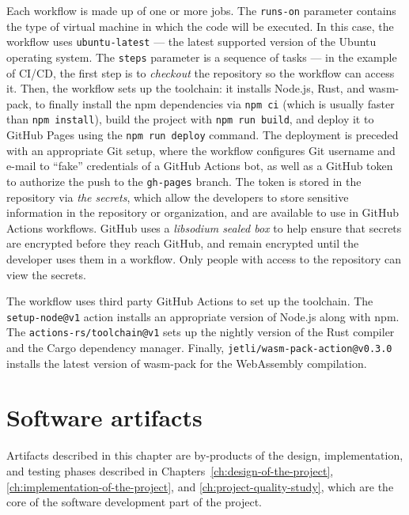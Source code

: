 \documentclass[english,bachelors,forcepolishlogotype]{wizthesis}
\begin{document}
Each workflow is made up of one or more jobs. The \texttt{runs-on} parameter
contains the type of virtual machine in which the code will be executed. In this
case, the workflow uses \texttt{ubuntu-latest} --- the latest supported version
of the Ubuntu operating system. The \texttt{steps} parameter is a sequence of
tasks --- in the example of CI/CD, the first step is to \emph{checkout} the
repository so the workflow can access it. Then, the workflow sets up the
toolchain: it installs Node.js, Rust, and wasm-pack, to finally install the npm
dependencies via \texttt{npm ci} (which is usually faster than \texttt{npm
install}), build the project with \texttt{npm run build}, and deploy it to
GitHub Pages using the \texttt{npm run deploy} command. The deployment is
preceded with an appropriate Git setup, where the workflow configures Git
username and e-mail to ``fake'' credentials of a GitHub Actions bot, as well as
a GitHub token to authorize the push to the \texttt{gh-pages} branch. The token
is stored in the repository via \emph{the secrets}, which allow the developers
to store sensitive information in the repository or organization, and are
available to use in GitHub Actions workflows. GitHub uses a \emph{libsodium
sealed box} to help ensure that secrets are encrypted before they reach GitHub,
and remain encrypted until the developer uses them in a workflow. Only people
with access to the repository can view the secrets.

The workflow uses third party GitHub Actions to set up the toolchain. The
\verb|setup-node@v1| action installs an appropriate version of Node.js along
with npm. The \verb|actions-rs/toolchain@v1| sets up the nightly version of
the Rust compiler and the Cargo dependency manager. Finally,
\verb|jetli/wasm-pack-action@v0.3.0| installs the latest version of wasm-pack
for the Web\-Assembly compilation.


\chapter{Software artifacts} \label{ch:software-artifacts}

Artifacts described in this chapter are by-products of the design,
implementation, and testing phases described in
Chapters~\ref{ch:design-of-the-project}, \ref{ch:implementation-of-the-project},
and \ref{ch:project-quality-study}, which are the core of the software
development part of the project.
\end{document}
